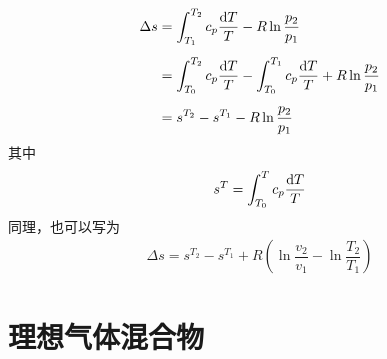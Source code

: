 \begin{align}
	\Delta s &= \int_{T_1}^{T_2} c_p \dfrac{{\rm{d}} T}{T} - R \ln\dfrac{p_2}{p_1} \notag\\[0.5em]
	&= \int_{T_0}^{T_2} c_p \dfrac{{\rm{d}} T}{T} - \int_{T_0}^{T_1} c_p \dfrac{{\rm{d}} T}{T} + R \ln\dfrac{p_2}{p_1} \notag \\[0.5em]
	& = s^{T_2} - s^{T_1} - R\ln \dfrac{p_2}{p_1}
\end{align}
其中
\begin{align}
	s^{T} = \int_{T_0}^{T} c_p \dfrac{{\rm{d}} T}{T}
\end{align}
同理，也可以写为
\begin{align}
	\Delta s = s^{T_2} - s^{T_1} + R\left(\ln \dfrac{v_2}{v_1} - \ln \dfrac{T_2}{T_1} \right)
\end{align}

\section{理想气体混合物}
